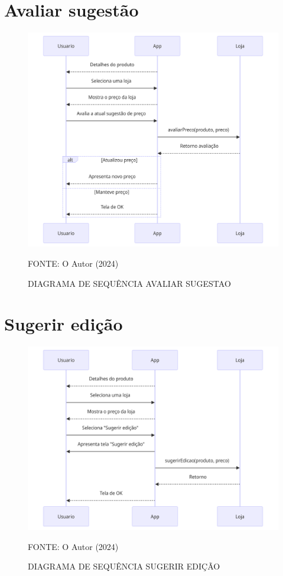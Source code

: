 \section{Avaliar sugestão}
\begin{figure}[H]
    \caption{\label{fig:label} DIAGRAMA DE SEQUÊNCIA AVALIAR SUGESTAO}
    \includegraphics[width = 150mm]{fig/sequencia/sequencia2.png}
    \footnotesize \centering
    \par FONTE: O Autor (2024)
\end{figure}


\section{Sugerir edição}
\begin{figure}[H]
    \caption{\label{fig:label} DIAGRAMA DE SEQUÊNCIA SUGERIR EDIÇÃO}
    \includegraphics[width = 150mm]{fig/sequencia/sequencia3.png}
    \footnotesize \centering
    \par FONTE: O Autor (2024)
\end{figure}

